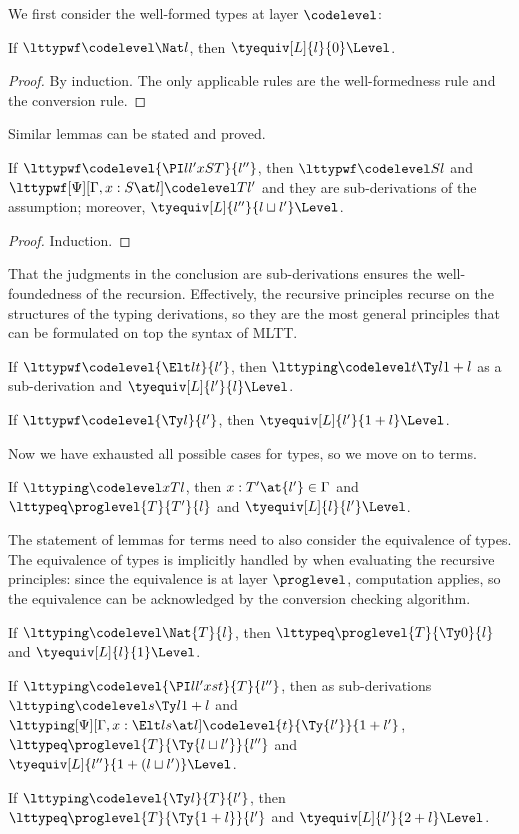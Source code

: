 We first consider the well-formed types at layer $\codelevel$:
\begin{lemma}
  If $\lttypwf \codelevel \Nat l$, then $\tyequiv[L]{l}{0}\Level$. 
\end{lemma}
\begin{proof}
  By induction. The only applicable rules are the well-formedness rule and the
  conversion rule. %
\end{proof}
Similar lemmas can be stated and proved.
\begin{lemma}
  If $\lttypwf \codelevel{\PI l{l'}x S T}{l''}$, then $\lttypwf \codelevel S{l}$ and
  $\lttypwf[\Psi][\Gamma, x : S \at l] \codelevel T{l'}$ and they are sub-derivations of the
  assumption; moreover, $\tyequiv[L]{l''}{l \sqcup l'}\Level$. 
\end{lemma}
\begin{proof}
  Induction. 
\end{proof}
That the judgments in the conclusion are sub-derivations ensures the well-foundedness
of the recursion. %
Effectively, the recursive principles recurse on the structures of the typing
derivations, so they are the most general principles that can be formulated on top the
syntax of MLTT.
\begin{lemma}
  If $\lttypwf \codelevel{\Elt l t}{l'}$, then $\lttyping \codelevel t{\Ty l}{1 + l}$ as a
  sub-derivation and $\tyequiv[L]{l'}{l}\Level$. 
\end{lemma}
\begin{lemma}
  If $\lttypwf \codelevel{\Ty l}{l'}$, then $\tyequiv[L]{l'}{1 + l}\Level$.
\end{lemma}
Now we have exhausted all possible cases for types, so we move on to terms.

\begin{lemma}
  If $\lttyping \codelevel x T l$, then $x : T' \at{l'} \in \Gamma$ and $\lttypeq \proglevel{T}{T'}{l}$
  and $\tyequiv[L]{l}{l'}\Level$. 
\end{lemma}
The statement of lemmas for terms need to also consider the equivalence of types. %
The equivalence of types is implicitly handled by when evaluating the recursive
principles: since the equivalence is at layer $\proglevel$, computation applies, so the
equivalence can be acknowledged by the conversion checking algorithm. %
\begin{lemma}
  If $\lttyping \codelevel \Nat{T}{l}$, then $\lttypeq \proglevel{T}{\Ty 0}{l}$ and $\tyequiv[L]{l}{1}\Level$. 
\end{lemma}
\begin{lemma}
  If $\lttyping \codelevel{\PI l{l'}x s t}{T}{l''}$, then as sub-derivations $\lttyping \codelevel s{\Ty
    l}{1 + l}$ and
  $\lttyping[\Psi][\Gamma, x : \Elt l s \at l] \codelevel{t}{\Ty{l'}}{1 + l'}$, $\lttypeq
  \proglevel{T}{\Ty{l \sqcup l'}}{l''}$ and $\tyequiv[L]{l''}{1 + {(l \sqcup l')}}\Level$. 
\end{lemma}
\begin{lemma}
  If $\lttyping \codelevel{\Ty l}{T}{l'}$, then $\lttypeq \proglevel{T}{\Ty{1 + l}}{l'}$ and
  $\tyequiv[L]{l'}{2 + l}\Level$.
\end{lemma}


